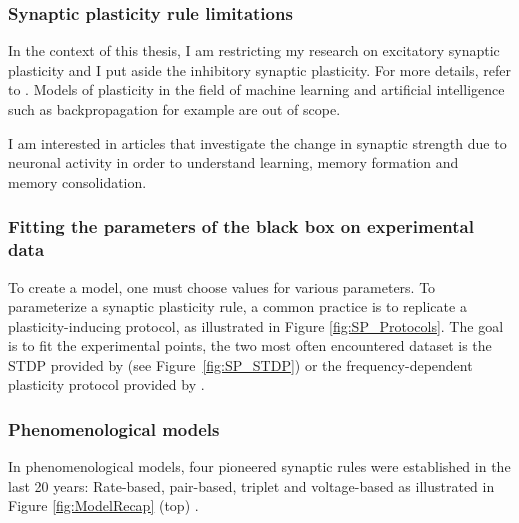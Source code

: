 \subsubsection{Synaptic plasticity rule limitations}
In the context of this thesis, I am restricting my research on excitatory synaptic plasticity and I put aside the inhibitory synaptic plasticity. For more details, refer to \citep{wu_regulation_2022}. Models of plasticity in the field of machine learning and artificial intelligence such as backpropagation for example are out of scope. 

I am interested in articles that investigate the change in synaptic strength due to neuronal activity in order to understand learning, memory formation and memory consolidation. 


\subsubsection{Fitting the parameters of the black box on experimental data}
To create a model, one must choose values for various parameters. To parameterize a synaptic plasticity rule, a common practice is to replicate a plasticity-inducing protocol, as illustrated in Figure \ref{fig:SP_Protocols}. The goal is to fit the experimental points, the two most often encountered dataset is the \acrshort{STDP} provided by \citep{bi_synaptic_1998} (see Figure~\ref{fig:SP_STDP}) or the frequency-dependent plasticity protocol provided by \citep{sjostrom_rate_2001}.


\subsubsection{Phenomenological models}
In phenomenological models, four pioneered synaptic rules were established in the last 20 years: Rate-based, pair-based, triplet and voltage-based as illustrated in Figure \ref{fig:ModelRecap} (top) \citep{gerstner_hebbian_2011, feldman_spike-timing_2012,  feldman_spike_2020}.



